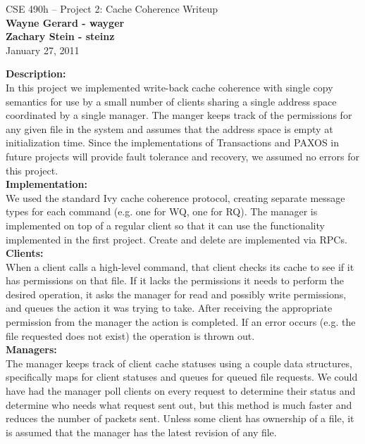 \documentclass[11pt]{article}
\begin{document}
\begin{center}
{\large CSE 490h -- Project 2: Cache Coherence Writeup} \\
\textbf{Wayne Gerard - wayger} \\
\textbf{Zachary Stein - steinz} \\
January 27, 2011
\end{center}

\textbf{Description:} \\

In this project we implemented write-back cache coherence with single copy semantics for use by a small number of clients sharing a single address space coordinated by a single manager. 
The manger keeps track of the permissions for any given file in the system and assumes that the address space is empty at initialization time.
Since the implementations of Transactions and PAXOS in future projects will provide fault tolerance and recovery, we assumed no errors for this project. \\

\textbf{Implementation:} \\

We used the standard Ivy cache coherence protocol, creating separate message types for each command (e.g. one for WQ, one for RQ).
The manager is implemented on top of a regular client so that it can use the functionality implemented in the first project. Create and delete are implemented via RPCs. \\

\textbf{Clients:} \\

When a client calls a high-level command, that client checks its cache to see if it has permissions on that file. If it lacks the permissions it needs to perform the desired operation, it asks the 
manager for read and possibly write permissions, and queues the action it was trying to take. After receiving the appropriate 
permission from the manager the action is completed. If an error occurs (e.g. the file requested does not exist) the operation is thrown out. \\

\textbf{Managers:} \\ 

The manager keeps track of client cache statuses using a couple data structures, specifically maps for client statuses and queues for queued file requests. We could have had the manager poll clients on every request to 
determine their status and determine who needs what request sent out, but this method is much faster and reduces the number of packets sent. Unless some
client has ownership of a file, it is assumed that the manager has the latest revision of any file.\\
\end{document}
